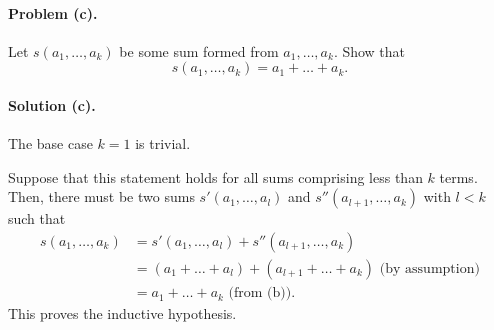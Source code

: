 \documentclass{article}
\begin{document}
\paragraph{Problem (c).} Let $s(a_1, \ldots, a_k)$ be some sum formed from $a_1, \ldots, a_k$. Show that \begin{equation*}
  s(a_1, \ldots, a_k) = a_1 + \ldots + a_k.
\end{equation*}

\paragraph{Solution (c).} The base case $k = 1$ is trivial.

Suppose that this statement holds for all sums comprising less than $k$ terms. Then, there must be two sums $s'(a_1, \ldots, a_l)$ and $s''(a_{l+1}, \ldots, a_k)$ with $l < k$ such that \begin{align*}
  s(a_1, \ldots, a_k) &= s'(a_1, \ldots, a_l) + s''(a_{l+1}, \ldots, a_k) \\
                      &= (a_1 + \ldots + a_l) + (a_{l+1} + \ldots + a_k) \text{ (by assumption)} \\
                      &= a_1 + \ldots + a_k \text{ (from (b))}.
\end{align*} This proves the inductive hypothesis.
\end{document}
